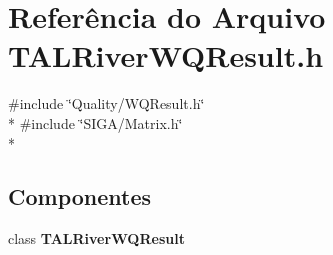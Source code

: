 \section{Referência do Arquivo T\+A\+L\+River\+W\+Q\+Result.\+h}
\label{_t_a_l_river_w_q_result_8h}
{\ttfamily \#include \char`\"{}Quality/\+W\+Q\+Result.\+h\char`\"{}}\\*
{\ttfamily \#include \char`\"{}S\+I\+G\+A/\+Matrix.\+h\char`\"{}}\\*
\subsection*{Componentes}
\begin{DoxyCompactItemize}
\item 
class {\bf T\+A\+L\+River\+W\+Q\+Result}
\end{DoxyCompactItemize}
